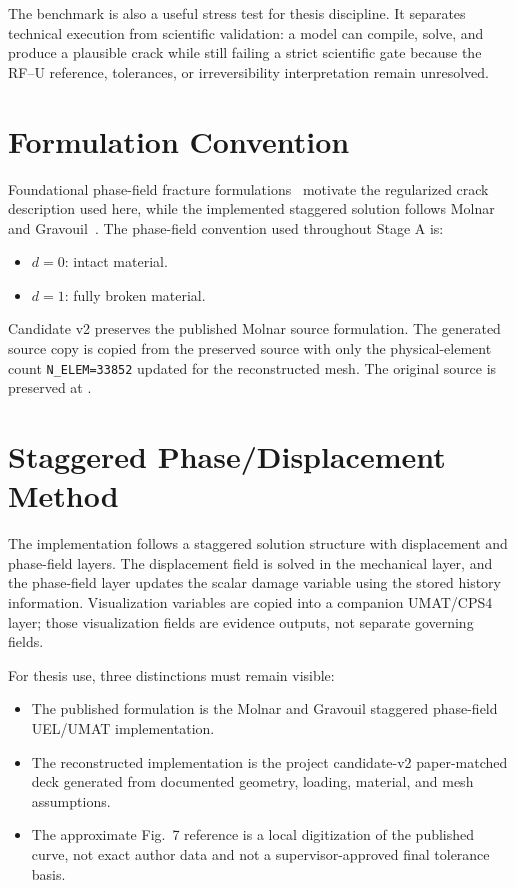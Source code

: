 The benchmark is also a useful stress test for thesis discipline. It separates
technical execution from scientific validation: a model can compile, solve, and
produce a plausible crack while still failing a strict scientific gate because
the RF--U reference, tolerances, or irreversibility interpretation remain
unresolved.

\section{Formulation Convention}

Foundational phase-field fracture formulations~\cite{bourdin2000,miehe2010a}
motivate the regularized crack description used here, while the implemented
staggered solution follows Molnar and Gravouil~\cite{molnar2017}. The
phase-field convention used throughout Stage A is:

\begin{itemize}
\item \(d=0\): intact material.
\item \(d=1\): fully broken material.
\end{itemize}

Candidate v2 preserves the published Molnar source formulation. The generated
source copy 
is copied from the preserved source with only the physical-element count
\texttt{N\_ELEM=33852} updated for the reconstructed mesh. The original source
is preserved at
.

\section{Staggered Phase/Displacement Method}

The implementation follows a staggered solution structure with displacement
and phase-field layers. The displacement field is solved in the mechanical
layer, and the phase-field layer updates the scalar damage variable using the
stored history information. Visualization variables are copied into a companion
UMAT/CPS4 layer; those visualization fields are evidence outputs, not separate
governing fields.

For thesis use, three distinctions must remain visible:

\begin{itemize}
\item The published formulation is the Molnar and Gravouil staggered
phase-field UEL/UMAT implementation.
\item The reconstructed implementation is the project candidate-v2
paper-matched deck generated from documented geometry, loading, material, and
mesh assumptions.
\item The approximate Fig.~7 reference is a local digitization of the published
curve, not exact author data and not a supervisor-approved final tolerance
basis.
\end{itemize}

